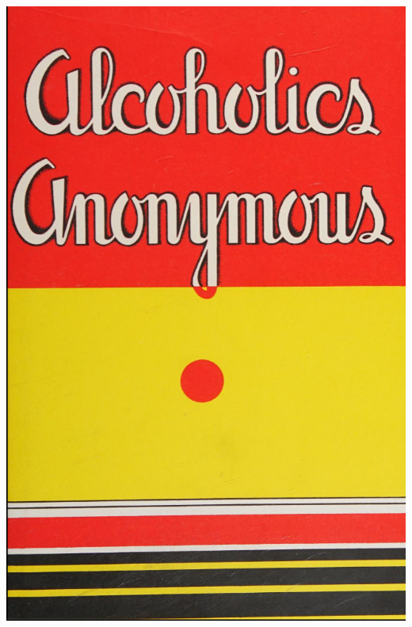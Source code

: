
\begin{titlingpage}


\begin{biblechapter}

    \centering
    \includegraphics[scale=0.55]{img/cover-ed1.png}


\end{biblechapter}
\end{titlingpage}
